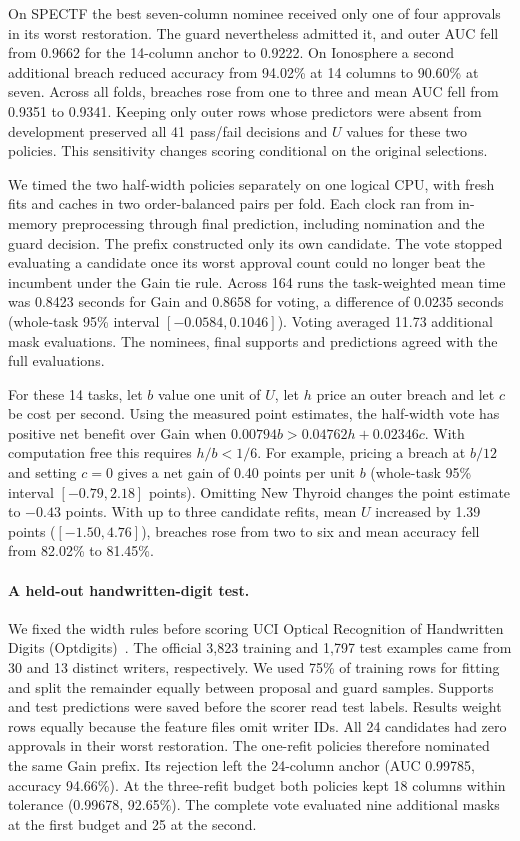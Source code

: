 On SPECTF the best seven-column nominee received only one of four approvals in its worst restoration. The guard nevertheless admitted it, and outer AUC fell from 0.9662 for the 14-column anchor to 0.9222. On Ionosphere a second additional breach reduced accuracy from 94.02\% at 14 columns to 90.60\% at seven. Across all folds, breaches rose from one to three and mean AUC fell from 0.9351 to 0.9341. Keeping only outer rows whose predictors were absent from development preserved all 41 pass/fail decisions and $U$ values for these two policies. This sensitivity changes scoring conditional on the original selections.

We timed the two half-width policies separately on one logical CPU, with fresh fits and caches in two order-balanced pairs per fold. Each clock ran from in-memory preprocessing through final prediction, including nomination and the guard decision. The prefix constructed only its own candidate. The vote stopped evaluating a candidate once its worst approval count could no longer beat the incumbent under the Gain tie rule. Across 164 runs the task-weighted mean time was 0.8423 seconds for Gain and 0.8658 for voting, a difference of 0.0235 seconds (whole-task 95\% interval $[-0.0584,0.1046]$). Voting averaged 11.73 additional mask evaluations. The nominees, final supports and predictions agreed with the full evaluations.

For these 14 tasks, let $b$ value one unit of $U$, let $h$ price an outer breach and let $c$ be cost per second. Using the measured point estimates, the half-width vote has positive net benefit over Gain when $0.00794 b>0.04762 h+0.02346 c$. With computation free this requires $h/b<1/6$. For example, pricing a breach at $b/12$ and setting $c=0$ gives a net gain of 0.40 points per unit $b$ (whole-task 95\% interval $[-0.79,2.18]$ points). Omitting New Thyroid changes the point estimate to $-0.43$ points. With up to three candidate refits, mean $U$ increased by 1.39 points ($[-1.50,4.76]$), breaches rose from two to six and mean accuracy fell from 82.02\% to 81.45\%.

\paragraph{A held-out handwritten-digit test.}
We fixed the width rules before scoring UCI Optical Recognition of Handwritten Digits (Optdigits)~\cite{optdigitsdata}. The official 3,823 training and 1,797 test examples came from 30 and 13 distinct writers, respectively. We used 75\% of training rows for fitting and split the remainder equally between proposal and guard samples. Supports and test predictions were saved before the scorer read test labels. Results weight rows equally because the feature files omit writer IDs. All 24 candidates had zero approvals in their worst restoration. The one-refit policies therefore nominated the same Gain prefix. Its rejection left the 24-column anchor (AUC 0.99785, accuracy 94.66\%). At the three-refit budget both policies kept 18 columns within tolerance (0.99678, 92.65\%). The complete vote evaluated nine additional masks at the first budget and 25 at the second.

